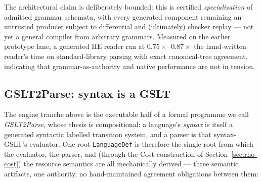 \documentclass[11pt]{article}
\newcommand{\code}[1]{\texttt{#1}}
\newcommand{\HE}{\textup{HE}}
\begin{document}
The architectural claim is deliberately bounded: this is certified
\emph{specialization} of admitted grammar schemata, with every generated
component remaining an untrusted producer subject to differential and
(ultimately) checker replay --- not yet a general compiler from arbitrary
grammars.  Measured on the earlier prototype lane, a generated \HE{} reader
ran at $0.75\times$--$0.87\times$ the hand-written reader's time on
standard-library parsing with exact canonical-tree agreement, indicating
that grammar-as-authority and native performance are not in tension.

\subsection{GSLT2Parse: syntax is a GSLT}

The engine tranche above is the executable half of a formal programme we
call \emph{GSLT2Parse}, whose thesis is compositional: a language's
\emph{syntax} is itself a generated syntactic labelled transition system,
and a parser is that syntax-GSLT's evaluator.  One root
\code{LanguageDef} is therefore the single root from which the evaluator,
the parser, and (through the Cost construction of
Section~\ref{sec:rho-cost}) the resource semantics are all mechanically
derived --- three semantic artifacts, one authority, no hand-maintained
agreement obligations between them:

\begin{center}
\end{center}
\end{document}

